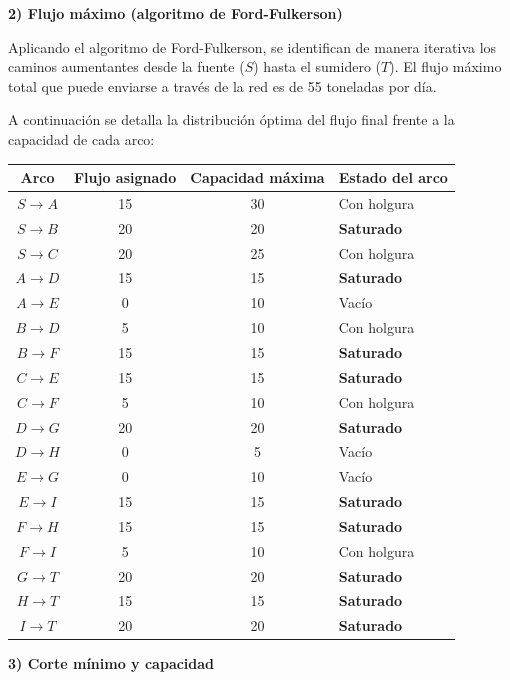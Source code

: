 \textbf{2) Flujo máximo (algoritmo de Ford-Fulkerson)}

Aplicando el algoritmo de Ford-Fulkerson, se identifican de manera iterativa los caminos aumentantes desde la fuente ($S$) hasta el sumidero ($T$). El flujo máximo total que puede enviarse a través de la red es de 55 toneladas por día.

A continuación se detalla la distribución óptima del flujo final frente a la capacidad de cada arco:

\begin{center}
\begin{tabular}{cccl}
\toprule
\textbf{Arco} & \textbf{Flujo asignado} & \textbf{Capacidad máxima} & \textbf{Estado del arco} \\
\midrule
$S \rightarrow A$ & 15 & 30 & Con holgura \\
$S \rightarrow B$ & 20 & 20 & \textbf{Saturado} \\
$S \rightarrow C$ & 20 & 25 & Con holgura \\ \midrule
$A \rightarrow D$ & 15 & 15 & \textbf{Saturado} \\
$A \rightarrow E$ & 0  & 10 & Vacío \\
$B \rightarrow D$ & 5  & 10 & Con holgura \\
$B \rightarrow F$ & 15 & 15 & \textbf{Saturado} \\
$C \rightarrow E$ & 15 & 15 & \textbf{Saturado} \\
$C \rightarrow F$ & 5  & 10 & Con holgura \\ \midrule
$D \rightarrow G$ & 20 & 20 & \textbf{Saturado} \\
$D \rightarrow H$ & 0  & 5  & Vacío \\
$E \rightarrow G$ & 0  & 10 & Vacío \\
$E \rightarrow I$ & 15 & 15 & \textbf{Saturado} \\
$F \rightarrow H$ & 15 & 15 & \textbf{Saturado} \\
$F \rightarrow I$ & 5  & 10 & Con holgura \\ \midrule
$G \rightarrow T$ & 20 & 20 & \textbf{Saturado} \\
$H \rightarrow T$ & 15 & 15 & \textbf{Saturado} \\
$I \rightarrow T$ & 20 & 20 & \textbf{Saturado} \\
\bottomrule
\end{tabular}
\end{center}

\textbf{3) Corte mínimo y capacidad}

